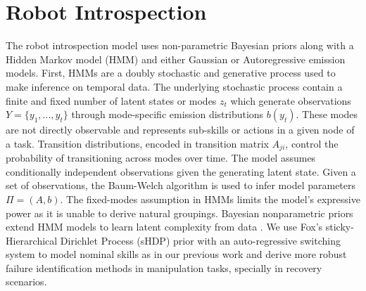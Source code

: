 \documentclass[letterpaper, 10 pt, conference]{ieeeconf}  %
\begin{document}
\section{Robot Introspection} \label{sec:robot_introspection}
The robot introspection model uses non-parametric Bayesian priors along with a Hidden Markov model (HMM) and either Gaussian or Autoregressive emission models. 
First, HMMs are a doubly stochastic and generative process used to make inference on temporal data. The underlying stochastic process contain a finite and fixed number of latent states or modes $z_t$ which generate observations $Y=\{ y_1,...,y_t \}$ through mode-specific emission distributions $b(y_t)$. These modes are not directly observable and represents sub-skills or actions in a given node of a task. Transition distributions, encoded in transition matrix $A_{ji}$, control the probability of transitioning across modes over time. The model assumes conditionally independent observations given the generating latent state. Given a set of observations, the Baum-Welch algorithm is used to infer model parameters $\Pi=(A,b)$. The fixed-modes assumption in HMMs limits the model's expressive power as it is unable to derive natural groupings. Bayesian nonparametric priors extend HMM models to learn latent complexity from data \cite{2010-Fox-BNP_LearningMarkovSwitchingProcesses,2014AOAS-Fox-JointModel_MutlipleTimeSeries_BetaProcess_MotionCapture}. We use Fox's \et sticky-Hierarchical Dirichlet Process (sHDP) prior with an auto-regressive switching system \cite{2010-Fox-BNP_LearningMarkovSwitchingProcesses} to model nominal skills as in our previous work \cite{2017humanoids-rojas-shdp-var-hmm} and derive more robust failure identification methods in manipulation tasks, specially in recovery scenarios. 
\end{document}
